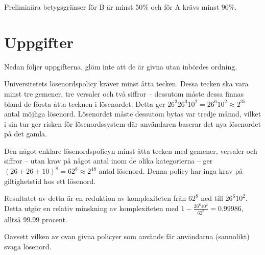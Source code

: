 \documentclass[a4paper,addpoints]{miunexam}
\begin{document}
Preliminära betygsgränser för B är minst \unit{50}{\%} och för A krävs minst 
\unit{90}{\%}.


\clearpage
\section*{Uppgifter}
Nedan följer uppgifterna, glöm inte att de är givna utan inbördes ordning.

\begin{questions}
  \question\label{q:pwdpolicy}
  Universitetets lösenordspolicy kräver minst åtta tecken.
  Dessa tecken ska vara minst tre gemener, tre versaler och två siffror -- 
  dessutom måste dessa finnas bland de första åtta tecknen i lösenordet.
  Detta ger \( 26^3 26^3 10^2 = 26^6 10^2 \approx 2^{35} \) antal möjliga 
  lösenord.
  Lösenordet måste dessutom bytas var tredje månad, vilket i sin tur ger risken 
  för lösenordssystem där användaren baserar det nya lösenordet på det gamla.

  Den något enklare lösenordspolicyn minst åtta tecken med gemener, versaler 
  och siffror -- utan krav på något antal inom de olika kategorierna -- ger \( 
  (26 + 26 + 10)^8 = 62^8 \approx 2^{48} \) antal lösenord.
  Denna policy har inga krav på giltighetstid hos ett lösenord.

  Resultatet av detta är en reduktion av komplexiteten från \( 62^8 \) ned till 
  \( 26^6 10^2 \).
  Detta utgör en relativ minskning av komplexiteten med \( 1-\frac{26^6 
  10^2}{62^8} = 0.99986 \), alltså 99.99 procent.

  Oavsett vilken av ovan givna policyer som används får användarna (sannolikt) 
  svaga lösenord.

\end{questions}
\end{document}
